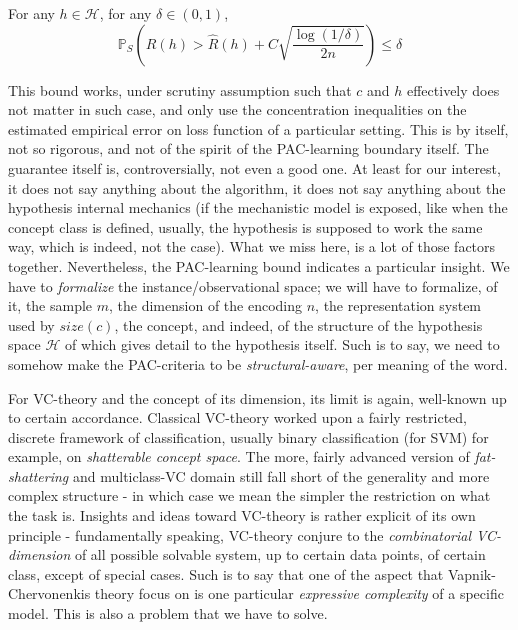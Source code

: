 \begin{proposition}\label{prop:PAC_ERM_1_recite}
    For any $h\in\mathcal{H}$, for any $\delta\in(0,1)$, 
    \begin{equation}
        \mathbb{P}_{S}\left( R(h) > \hat{R}(h)+ C\sqrt{\frac{\log{(1/\delta)}}{2n}}\right)\leq \delta
    \end{equation}
\end{proposition}

This bound works, under scrutiny assumption such that $c$ and $h$ effectively does not matter in such case, and only use the concentration inequalities on the estimated empirical error on loss function of a particular setting. This is by itself, not so rigorous, and not of the spirit of the PAC-learning boundary itself. The guarantee itself is, controversially, not even a good one. At least for our interest, it does not say anything about the algorithm, it does not say anything about the hypothesis internal mechanics (if the mechanistic model is exposed, like when the concept class is defined, usually, the hypothesis is supposed to work the same way, which is indeed, not the case). What we miss here, is a lot of those factors together. Nevertheless, the PAC-learning bound indicates a particular insight. We have to \textit{formalize} the instance/observational space; we will have to formalize, of it, the sample $m$, the dimension of the encoding $n$, the representation system used by $size(c)$, the concept, and indeed, of the structure of the hypothesis space $\mathcal{H}$ of which gives detail to the hypothesis itself. Such is to say, we need to somehow make the PAC-criteria to be \textit{structural-aware}, per meaning of the word. 

For VC-theory and the concept of its dimension, its limit is again, well-known up to certain accordance. Classical VC-theory worked upon a fairly restricted, discrete framework of classification, usually binary classification (for SVM) for example, on \textit{shatterable concept space}. The more, fairly advanced version of \textit{fat-shattering} and multiclass-VC domain still fall short of the generality and more complex structure - in which case we mean the simpler the restriction on what the task is. Insights and ideas toward VC-theory is rather explicit of its own principle - fundamentally speaking, VC-theory conjure to the \textit{combinatorial VC-dimension} of all possible solvable system, up to certain data points, of certain class, except of special cases. Such is to say that one of the aspect that Vapnik-Chervonenkis theory focus on is one particular \textit{expressive complexity} of a specific model. This is also a problem that we have to solve. 

